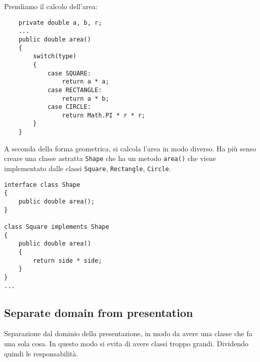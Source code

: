 Prendiamo il calcolo dell'area:
\begin{lstlisting}
    private double a, b, r;
    ...
    public double area()
    {
        switch(type)
        {
            case SQUARE:
                return a * a;
            case RECTANGLE:
                return a * b;
            case CIRCLE:
                return Math.PI * r * r;
        }
    }
\end{lstlisting}
A seconda della forma geometrica, si calcola l'area
in modo diverso.
Ha più senso creare una classe astratta \texttt{Shape} che
ha un metodo \texttt{area()} che viene implementato dalle classi
\texttt{Square}, \texttt{Rectangle}, \texttt{Circle}.
\begin{lstlisting}
interface class Shape
{
    public double area();
}

class Square implements Shape
{
    public double area()
    {
        return side * side;
    }
}
...
\end{lstlisting}
\subsection{Separate domain from presentation}
Separazione dal dominio della presentazione, in modo da avere una classe che
fa una sola cosa. In questo modo si evita di avere classi troppo grandi.
Dividendo quindi le responsabilità.
